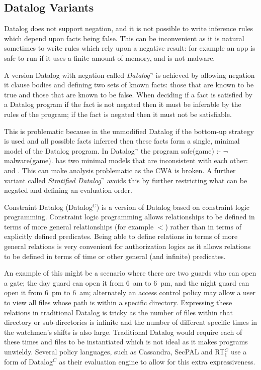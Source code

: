 \documentclass[a4paper]{article}
\begin{document}

\subsection{Datalog Variants}

Datalog does not support negation, and it is not possible to write inference
rules which depend upon facts being false.  This can be inconvenient as it is
natural sometimes to write rules which rely upon a negative result: for example
an app is safe to run if it uses a finite amount of memory, and is not malware.

A version Datalog with negation called \emph{Datalog$^\lnot$}\cite{Ceri:1989ff} is
achieved by allowing negation it clause bodies and defining two sets of known
facts: those that are known to be true and those that are known to be false.
When deciding if a fact is satisfied by a Datalog program if the fact is not
negated then it must be inferable by the rules of the program; if the fact is
negated then it must not be satisfiable.  

This is problematic because in the unmodified Datalog if the bottom-up strategy
is used and all possible facts inferred then these facts form a single, minimal
model of the Datalog program.  In Datalog$^\lnot$ the program \textsf{safe(game)
:- $\mathsf\lnot$ malware(game).} has two minimal models that are inconsistent
with each other:  and .  This can make
analysis problematic as the \ac{CWA} is broken. A further variant called
\emph{Stratified Datalog$^\lnot$} avoids this by further restricting what can be
negated and defining an evaluation order\cite{Apt:1986vj}.

Constraint Datalog (Datalog$^C$\cite{Li:2003ix}) is a version of Datalog based
on constraint logic programming.  Constraint logic programming allows
relationships to be defined in terms of more general relationships (for example
$<$) rather than in terms of explicitly defined predicates.  Being able to
define relations in terms of more general relations is very convenient for
authorization logics as it allows relations to be defined in terms of time or
other general (and infinite) predicates. 

An example of this might be a scenario where there are two guards who can open a
gate; the day guard can open it from 6~am to 6~pm, and the night guard can open
it from 6~pm to 6~am; alternately an access control policy may allow a user to
view all files whose path is within a specific directory.  Expressing these
relations in traditional Datalog is tricky as the number of files within that
directory or sub-directories is infinite and the number of different specific
times in the watchmen's shifts is also large.  Traditional Datalog would require
each of these times and files to be instantiated which is not ideal as it makes
programs unwieldy. Several policy languages, such as
Cassandra\cite{Becker:2004fi}, SecPAL\cite{Becker:2006vh} and
RT$_1^C$\cite{Li:2003ix} use a form of Datalog$^C$ as their evaluation engine to
allow for this extra expressiveness.
\end{document}
